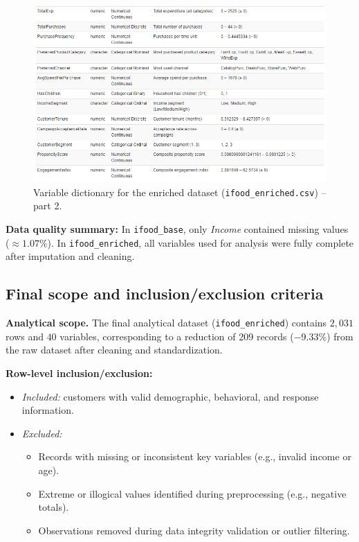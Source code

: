 \begin{figure}[H]
    \centering
    \includegraphics[width=\textwidth]{Imatges/metadata_enriched2.png}
    \caption{Variable dictionary for the enriched dataset (\texttt{ifood\_enriched.csv}) – part 2.}
    \label{fig:metadata_enriched_2}
\end{figure}

\noindent
\textbf{Data quality summary:} In \texttt{ifood\_base}, only \textit{Income} contained missing values
($\approx 1.07\%$). In \texttt{ifood\_enriched}, all variables used for analysis were
fully complete after imputation and cleaning.

\vspace{0.5em}

\subsection{Final scope and inclusion/exclusion criteria}

\textbf{Analytical scope.}
The final analytical dataset (\texttt{ifood\_enriched}) contains \(2{,}031\) rows and \(40\)
variables, corresponding to a reduction of 209 records (−9.33\%) from the raw
dataset after cleaning and standardization.

\textbf{Row-level inclusion/exclusion:}
\begin{itemize}
    \item \textit{Included:} customers with valid demographic, behavioral, and response information.
    \item \textit{Excluded:}
    \begin{itemize}
        \item Records with missing or inconsistent key variables (e.g., invalid income or age).
        \item Extreme or illogical values identified during preprocessing (e.g., negative totals).
        \item Observations removed during data integrity validation or outlier filtering.
    \end{itemize}
\end{itemize}


